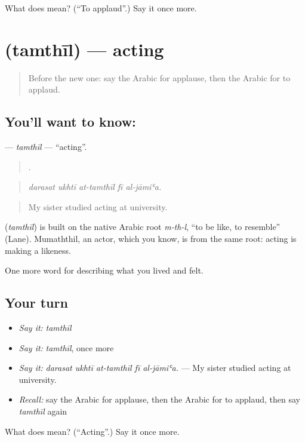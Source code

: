 \begin{tcolorbox}[breakable,colback=teal!4,colframe=teal!35!black,title={Before you move on}]
What does  mean? (\textquotedblleft{}To applaud\textquotedblright{}.) Say it once more.
\end{tcolorbox}
\section[\texorpdfstring{\ar{تمثيل} (tamthīl)}{تمثيل (tamthīl)}]{ (tamthīl) — acting}

\label{lesson:AR-C542-tamthil}



\begin{quote}
Before the new one: say the Arabic for applause, then the Arabic for to applaud.
\end{quote}

\subsection*{You'll want to know: }
\textbf{} — \emph{tamthīl} — \textquotedblleft{}acting\textquotedblright{}.

\begin{quote}
    .
\end{quote}

\begin{quote}
\emph{darasat ukhtī at-tamthīl fī al-jāmiʿa.}
\end{quote}

\begin{quote}
My sister studied acting at university.
\end{quote}

\begin{cousinweb}
\textbf{} (\emph{tamthīl}) is built on the native Arabic root \emph{m-th-l}, \textquotedblleft{}to be like, to resemble\textquotedblright{} (Lane). Mumaththil, an actor, which you know, is from the same root: acting is making a likeness.
\end{cousinweb}

\begin{grammarlens}[title={What you've built}]
One more word for describing what you lived and felt.
\end{grammarlens}

\subsection*{Your turn}
\begin{itemize}
\raggedright
  \item \emph{Say it:} \emph{tamthīl}
  \item \emph{Say it:} \emph{tamthīl}, once more
  \item \emph{Say it:} \emph{darasat ukhtī at-tamthīl fī al-jāmiʿa.} — My sister studied acting at university.
  \item \emph{Recall:} say the Arabic for applause, then the Arabic for to applaud, then say \emph{tamthīl} again
\end{itemize}

\begin{tcolorbox}[breakable,colback=teal!4,colframe=teal!35!black,title={Before you move on}]
What does  mean? (\textquotedblleft{}Acting\textquotedblright{}.) Say it once more.
\end{tcolorbox}
